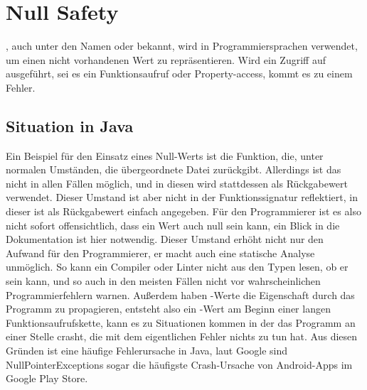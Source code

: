 
\section{Null Safety}\label{sec:null-safety}

\renewcommand{\kapitelautor}{Autor: Marvin Kurka}

, auch unter den Namen  oder  bekannt, wird in Programmiersprachen
verwendet, um einen nicht vorhandenen Wert zu repräsentieren.
Wird ein Zugriff auf  ausgeführt, sei es ein Funktionsaufruf oder Property-access, kommt es zu
einem Fehler.

\subsection{Situation in Java}
Ein Beispiel für den Einsatz eines Null-Werts ist die  Funktion, die, unter normalen
Umständen, die übergeordnete Datei zurückgibt.
Allerdings ist das nicht in allen Fällen möglich, und in diesen wird  stattdessen als Rückgabewert
verwendet.
Dieser Umstand ist aber nicht in der Funktionssignatur reflektiert, in dieser ist als Rückgabewert einfach
 angegeben.
Für den Programmierer ist es also nicht sofort offensichtlich, dass ein Wert auch null sein kann, ein Blick in die
Dokumentation ist hier notwendig.
Dieser Umstand erhöht nicht nur den Aufwand für den Programmierer, er macht auch eine statische Analyse unmöglich.
So kann ein Compiler oder Linter nicht aus den Typen lesen, ob er  sein kann, und so auch in den
meisten Fällen nicht vor wahrscheinlichen Programmierfehlern warnen.
Außerdem haben -Werte die Eigenschaft durch das Programm zu propagieren, entsteht also ein
-Wert am Beginn einer langen Funktionsaufrufskette, kann es zu Situationen kommen in der das Programm
an einer Stelle crasht, die mit dem eigentlichen Fehler nichts zu tun hat.
Aus diesen Gründen ist  eine häufige Fehlerursache in Java, laut Google sind
NullPointerExceptions sogar die häufigste Crash-Ursache von Android-Apps im Google Play Store.

